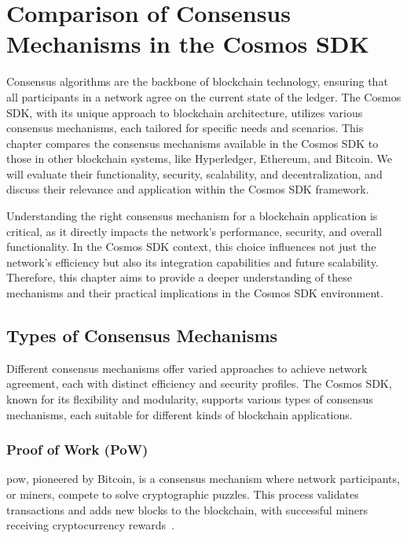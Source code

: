 \chapter{Comparison of Consensus Mechanisms in the Cosmos SDK}
\label{ch:compare}

Consensus algorithms are the backbone of blockchain technology, ensuring that all participants in a network agree on the current state of the ledger. The Cosmos SDK, with its unique approach to blockchain architecture, utilizes various consensus mechanisms, each tailored for specific needs and scenarios. This chapter compares the consensus mechanisms available in the Cosmos SDK to those in other blockchain systems, like Hyperledger, Ethereum, and Bitcoin. We will evaluate their functionality, security, scalability, and decentralization, and discuss their relevance and application within the Cosmos SDK framework.

Understanding the right consensus mechanism for a blockchain application is critical, as it directly impacts the network's performance, security, and overall functionality. In the Cosmos SDK context, this choice influences not just the network's efficiency but also its integration capabilities and future scalability. Therefore, this chapter aims to provide a deeper understanding of these mechanisms and their practical implications in the Cosmos SDK environment.

\section{Types of Consensus Mechanisms}

Different consensus mechanisms offer varied approaches to achieve network agreement, each with distinct efficiency and security profiles. The Cosmos SDK, known for its flexibility and modularity, supports various types of consensus mechanisms, each suitable for different kinds of blockchain applications.

\subsection{Proof of Work (PoW)}

\gls{pow}, pioneered by Bitcoin, is a consensus mechanism where network participants, or miners, compete to solve cryptographic puzzles. This process validates transactions and adds new blocks to the blockchain, with successful miners receiving cryptocurrency rewards~\cite{nakamoto2008bitcoin}.

